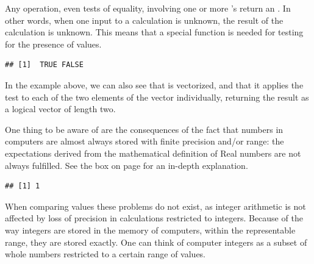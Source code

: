 \documentclass[krantz2]{krantz}\usepackage{knitr}
\begin{document}
Any operation, even tests of equality, involving one or more 's return an . In other words, when one input to a calculation is unknown, the result of the calculation is unknown. This means that a special function is needed for testing for the presence of  values.

\begin{knitrout}\footnotesize
{}\color{fgcolor}\begin{kframe}
\begin{alltt}
\hlstd{(}\hlstd{(}\hlstd{,} \hlstd{))}
\end{alltt}
\begin{verbatim}
## [1]  TRUE FALSE
\end{verbatim}
\end{kframe}
\end{knitrout}

In the example above, we can also see that  is vectorized, and that it applies the test to each of the two elements of the vector individually, returning the result as a logical vector of length two.

One thing to be aware of are the consequences of the fact that numbers in computers are almost always stored with finite precision and/or range: the expectations derived from the mathematical definition of Real numbers are not always fulfilled. See the box on page \pageref{box:floats} for an in-depth explanation.

\begin{knitrout}\footnotesize
{}\color{fgcolor}\begin{kframe}
\begin{alltt}
 \hlopt{-} 
\end{alltt}
\begin{verbatim}
## [1] 1
\end{verbatim}
\end{kframe}
\end{knitrout}

When comparing  values these problems do not exist, as integer arithmetic is not affected by loss of precision in calculations restricted to integers. Because of the way integers are stored in the memory of computers, within the representable range, they are stored exactly. One can think of computer integers as a subset of whole numbers restricted to a certain range of values.
\end{document}
